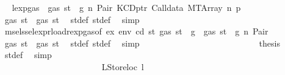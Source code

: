 \begin{isabellebody}
\ \isamarkupfalse%
\ lexp{\isacharunderscore}{\kern0pt}gas\ {\isacharbackquoteopen}{\isasymnot}\ gas\ st\ {\isasymle}\ g{\isacharbackquoteclose}\ n\ Pair\ KCDptr\ Calldata\ MTArray\ n{}\ p{}\ \isamarkupfalse%
\ {\isachardoublequoteopen}gas\ st{\isacharprime}{\kern0pt}{\isacharprime}{\kern0pt}{\isacharprime}{\kern0pt}\ {\isasymle}\ gas\ st{\isacharprime}{\kern0pt}{\isacharprime}{\kern0pt}{\isachardoublequoteclose}\ \isamarkupfalse%
\ st{\isacharprime}{\kern0pt}{\isacharprime}{\kern0pt}{\isacharunderscore}{\kern0pt}def\ st{\isacharprime}{\kern0pt}{\isacharprime}{\kern0pt}{\isacharprime}{\kern0pt}{\isacharunderscore}{\kern0pt}def\ \isamarkupfalse%
\ simp\isanewline
\ \ \ \ \ \ \ \ \ \ \ \ \ \ \ \ \ \ \ \ \ \ \ \ \isamarkupfalse%
\ \isamarkupfalse%
\ msel{\isacharunderscore}{\kern0pt}ssel{\isacharunderscore}{\kern0pt}expr{\isacharunderscore}{\kern0pt}load{\isacharunderscore}{\kern0pt}rexp{\isacharunderscore}{\kern0pt}gas{\isacharparenleft}{\kern0pt}{}{\isacharparenright}{\kern0pt}{\isacharbrackleft}{\kern0pt}of\ ex\ env\ cd\ st{\isacharprime}{\kern0pt}\ {\isachardoublequoteopen}gas\ st\ {\isacharminus}{\kern0pt}\ g{\isachardoublequoteclose}{\isacharbrackright}{\kern0pt}\ {\isacharbackquoteopen}{\isasymnot}\ gas\ st\ {\isasymle}\ g{\isacharbackquoteclose}\ n\ Pair\ \isamarkupfalse%
\ {\isachardoublequoteopen}gas\ st{\isacharprime}{\kern0pt}{\isacharprime}{\kern0pt}\ {\isasymle}\ gas\ st{\isacharprime}{\kern0pt}{\isachardoublequoteclose}\ \isamarkupfalse%
\ st{\isacharprime}{\kern0pt}{\isacharunderscore}{\kern0pt}def\ st{\isacharprime}{\kern0pt}{\isacharprime}{\kern0pt}{\isacharunderscore}{\kern0pt}def\ \isamarkupfalse%
\ simp\isanewline
\ \ \ \ \ \ \ \ \ \ \ \ \ \ \ \ \ \ \ \ \ \ \ \ \isamarkupfalse%
\ \isamarkupfalse%
\ {\isacharquery}{\kern0pt}thesis\ \isamarkupfalse%
\ st{\isacharprime}{\kern0pt}{\isacharunderscore}{\kern0pt}def\ \isamarkupfalse%
\ simp\isanewline
\ \ \ \ \ \ \ \ \ \ \ \ \ \ \ \ \ \ \ \ \ \ \isamarkupfalse%
\isanewline
\ \ \ \ \ \ \ \ \ \ \ \ \ \ \ \ \ \ \ \ \isamarkupfalse%
\isanewline
\ \ \ \ \ \ \ \ \ \ \ \ \ \ \ \ \ \ \ \ \ \ \isamarkupfalse%
\ {\isacharparenleft}{\kern0pt}LStoreloc\ l{\isacharparenright}{\kern0pt}\isanewline
\ \ \ \ \ \ \ \ \ \ \ \ \ \ \ \ \ \ \ \ \ \ \isamarkupfalse%
\ \isamarkupfalse%

\end{isabellebody}
